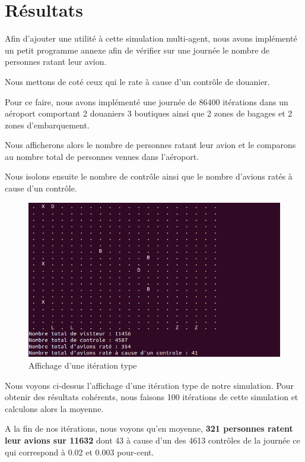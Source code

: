 \documentclass[12pt,french]{article} %
\begin{document}
\section{Résultats}


Afin d'ajouter une utilité à cette simulation multi-agent, nous avons implémenté un petit programme annexe afin de vérifier sur une journée le nombre de personnes ratant leur avion. 

Nous mettons de coté ceux qui le rate à cause d'un contrôle de douanier. 

Pour ce faire, nous avons implémenté une journée de 86400 itérations dans un aéroport comportant 2 douaniers 3 boutiques ainsi que 2 zones de bagages et 2 zones d'embarquement. 

Nous afficherons alors le nombre de personnes ratant leur avion et le comparons au nombre total de personnes venues dans l'aéroport.

Nous isolons ensuite le nombre de contrôle ainsi que le nombre d'avions ratés à cause d'un contrôle. 



\begin{figure}[H]
	\centering
	\includegraphics[scale=0.6]{ite.png}
	\caption{Affichage d'une itération type}    
\end{figure}

Nous voyons ci-dessus l'affichage d'une itération type de notre simulation. Pour obtenir des résultats cohérents, nous faisons 100 itérations de cette simulation et calculons alors la moyenne.  
\newline


A la fin de nos itérations, nous voyons qu'en moyenne, \textbf{321 personnes ratent leur avions sur 11632} dont 43 à cause d'un des 4613 contrôles de la journée ce qui correspond à 0.02 et 0.003 pour-cent.
\end{document}
